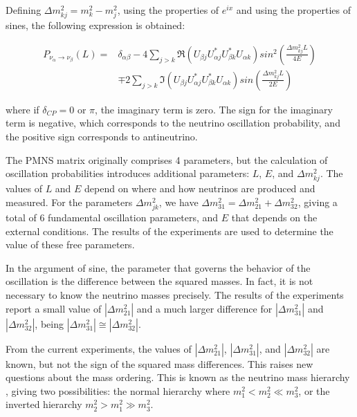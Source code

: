 Defining $\Delta m^2_{kj}=m^2_k - m^2_j$, using the properties of $e^{ix}$ and using the properties of sines, the following expression is obtained:

\begin{equation}
    \begin{split}
        P_{\nu_\alpha\rightarrow\nu_\beta}(L) = & \delta_{\alpha\beta} - 4\sum_{j>k}\Re\left(U_{\beta j} U^*_{\alpha j} U^*_{\beta k} U_{\alpha k}\right) sin^2\left(\frac{\Delta m^2_{kj}L}{4E}\right) \\
        & \mp 2\sum_{j>k}\Im\left(U_{\beta j} U^*_{\alpha j} U^*_{\beta k} U_{\alpha k}\right) sin\left(\frac{\Delta m^2_{kj}L}{2E}\right)
    \end{split}
\end{equation}

where if $\delta_{CP}= 0$ or $\pi$, the imaginary term is zero. The sign for the imaginary term is negative, which corresponds to the neutrino oscillation probability, and the positive sign corresponds to antineutrino. 

The PMNS matrix originally comprises 4 parameters, but the calculation of oscillation probabilities introduces additional parameters: $L$, $E$, and $\Delta m^2_{kj}$. The values of $L$ and $E$ depend on where and how neutrinos are produced and measured. For the parameters $\Delta m^2_{jk}$, we have $\Delta m^2_{31} = \Delta m^2_{21} + \Delta m^2_{32}$, giving a total of 6 fundamental oscillation parameters, and $E$ that depends on the external conditions. The results of the experiments are used to determine the value of these free parameters.

In the argument of sine, the parameter that governs the behavior of the oscillation is the difference between the squared masses. In fact, it is not necessary to know the neutrino masses precisely. The results of the experiments report a small value of $|\Delta m^2_{21}|$ and a much larger difference for $|\Delta m^2_{31}|$ and $|\Delta m^2_{32}|$, being $|\Delta m^2_{31}| \cong |\Delta m^2_{32}|$. 

From the current experiments, the values of $|\Delta m^2_{21}|$, $|\Delta m^2_{31}|$, and $|\Delta m^2_{32}|$ are known, but not the sign of the squared mass differences. This raises new questions about the mass ordering. This is known as the neutrino mass hierarchy , giving two possibilities: the normal hierarchy where $m^2_1 < m^2_2 \ll m^2_3$, or the inverted hierarchy $m^2_2 > m^2_1 \gg m^2_3$.

